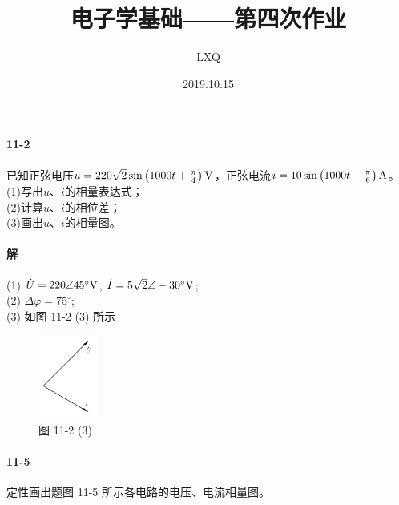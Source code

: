 \documentclass[hyperref, UTF8]{ctexart}
\title{电子学基础——第四次作业}
\author{LXQ}
\date{2019.10.15}
\newcommand{\volt}{{\rm V}}
\newcommand{\ampere}{{\rm A}}
\newcommand{\degree}{^{\circ}}
\begin{document}
\maketitle

\paragraph{11-2}\label{11-2}
已知正弦电压$u=220\sqrt{2}\sin\left(1000t+\frac{\pi}{4}\right)\volt$，正弦电流$i=10\sin\left(1000t-\frac{\pi}{6}\right)\ampere$。\\

(1)写出$u$、$i$的相量表达式；\\

(2)计算$u$、$i$的相位差；\\

(3)画出$u$、$i$的相量图。

\paragraph{解}
(1) $\dot{U}=220 \angle 45 \degree \volt$, $\dot{I}=5\sqrt{2}\angle -30 \degree \volt$; \\

(2) $\Delta \varphi = 75\degree$; \\

(3) 如图 11-2 (3) 所示

\begin{figure}[!htb]
\centering
\includegraphics[width=0.172\textwidth]{p11-2-3-sol.png}
\caption*{图 11-2 (3)}
\end{figure}

\paragraph{11-5}\label{11-5}
定性画出题图 11-5 所示各电路的电压、电流相量图。
\end{document}
